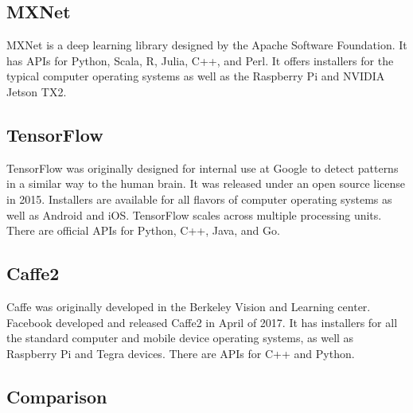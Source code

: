 \documentclass[letterpaper,10pt,onecolumn]{IEEEtran}
\begin{document}
  \subsection {MXNet}
    MXNet is a deep learning library designed by the Apache Software Foundation. It has APIs for Python, Scala, R, Julia, C++, and Perl. It offers installers for the typical computer operating systems as well as the Raspberry Pi and NVIDIA Jetson TX2. \cite{mxnet} 
  \subsection {TensorFlow}
    TensorFlow was originally designed for internal use at Google to detect patterns in a similar way to the human brain. It was released under an open source license in 2015. \cite{mapr-tensor} Installers are available for all flavors of computer operating systems as well as Android and iOS. TensorFlow scales across multiple processing units. There are official APIs for Python, C++, Java, and Go. \cite{tensor-lang}
  \subsection {Caffe2}
	Caffe was originally developed in the Berkeley Vision and Learning center. Facebook developed and released Caffe2 in April of 2017. It has installers for all the standard computer and mobile device operating systems, as well as Raspberry Pi and Tegra devices. There are APIs for C++ and Python.
  \subsection {Comparison}
    

    \clearpage
    {}
    
\end{document}
